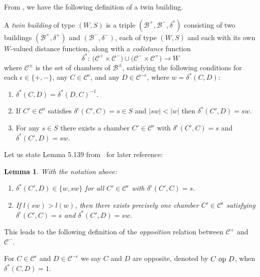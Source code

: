 \documentclass[pdftex]{sigma}
\numberwithin{equation}{section}
\newtheorem{Lemma}[Theorem]{Lemma}
\def\eps{\epsilon}
\def\cB{\mathcal B}
\def\cC{\mathcal C}
\begin{document}
From \cite[Definition 5.133]{AbramenkoBrown08}, we have the following definition of a twin building.
\begin{Definition}\label{definition:Twin_Building}
A {\em twin building} of type $(W,S)$ is a triple $(\cB^+, \cB^-, \delta^*)$ consisting of two buildings $(\cB^+, \delta^+)$ and $(\cB^-, \delta^-)$, each of type $(W,S)$ and each with its own $W$-valued distance function, along with a {\it codistance} function
\[\delta^* \colon \ \big(\cC^+ \times\cC^-\big) \cup \big(\cC^- \times\cC^+\big) \to W\]
where $\cC^\pm$ is the set of chambers of $\cB^\pm$, satisfying the following conditions for each $\eps\in\{+,-\}$, any $C\in\cC^\eps$,
and any $D\in\cC^{-\eps}$, where $w = \delta^*(C,D)$:
\begin{enumerate}\itemsep=0pt
 \item[(Tw1)] $\delta^*(C,D) = \delta^*(D,C)^{-1}$.
 \item[(Tw2)] If $C'\in\cC^\eps$ satisfies $\delta^\eps(C',C) = s\in S$ and $|sw| < |w|$ then $\delta^*(C',D) = sw$.
 \item[(Tw3)] For any $s\in S$ there exists a chamber $C'\in\cC^\eps$ with $\delta^\eps(C',C) = s$ and $\delta^*(C',D) = sw$.
\end{enumerate}
\end{Definition}

Let us state Lemma 5.139 from~\cite{AbramenkoBrown08} for later reference:

\begin{Lemma}\label{lemma:longer_element_chamber_unique}
With the notation above:
\begin{enumerate}\itemsep=0pt
\item[$1.$] $\delta^*(C',D) \in \{w, sw\}$ for all $C'\in\cC^\eps$ with $\delta^\eps(C',C) = s$.
\item[$2.$] If $l(sw) > l(w)$, then there exists precisely one chamber $C'\in\cC^\eps$ satisfying $\delta^\eps(C',C) = s$ and $\delta^*(C',D) = sw$.
\end{enumerate}
\end{Lemma}

This leads to the following definition of the {\it opposition} relation between $\cC^+$ and $\cC^-$.
\begin{Definition}\label{definition:Opposition_Relation}
For $C\in\cC^\eps$ and $D\in\cC^{-\eps}$ we say $C$ and $D$ are opposite, denoted by $C\ {\rm op}\ D$, when $\delta^*(C,D) = 1$.
\end{Definition}
\end{document}
